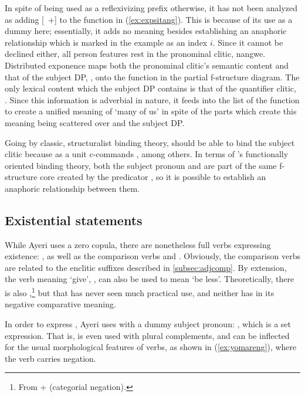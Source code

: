 In spite of  being used as a reflexivizing prefix
otherwise, it has not been analyzed as adding [\Refl{}~$+$] to the
\Subj{} function in (\ref{ex:expsitang}). This is because of its use as a dummy
here; essentially, it adds no meaning besides establishing an anaphoric
relationship which is marked in the example as an index $i$. Since it cannot be
declined either, all person features rest in the pronominal clitic, 
{nang}{we}. Distributed exponence maps both the pronominal clitic's semantic
content and that of the subject DP, , onto the
\Subj{} function in the partial f-structure diagram. The only lexical content
which the subject DP contains is that of the quantifier clitic,
. Since this information is adverbial in nature, it
feeds into the \Adjc{} list of the \Subj{} function to create a unified meaning
of `many of us' in spite of the parts which create this meaning being scattered
over  and the subject DP.

Going by classic, structuralist binding theory,  should be
able to bind the subject clitic because  as a unit
c-commands , among others. In terms of \Lfg{}'s
functionally oriented binding theory, both the subject pronoun and
 are part of the same f-structure core created by
the predicator , so it is possible to establish an
anaphoric relationship between them.

\subsection{Existential statements}
\label{subsec:exs}

While Ayeri uses a zero copula, there are nonetheless full verbs expressing
existence: , as well as the
comparison verbs   and
. Obviously, the comparison verbs are related to the
enclitic suffixes described in \autoref{subsec:adjcomp}. By extension, the verb
meaning `give', , can also be used to mean `be less'.
Theoretically, there is also ,\footnote{From
 +  (categorial negation).} but that
has never seen much practical use, and neither has  in its
negative comparative meaning.

In order to express , Ayeri uses  with a dummy
subject pronoun: , which is a set
expression. That is,  is even used with plural
complements, and can be inflected for the usual morphological features of
verbs, as shown in (\ref{ex:yomareng}), where the verb carries negation.

